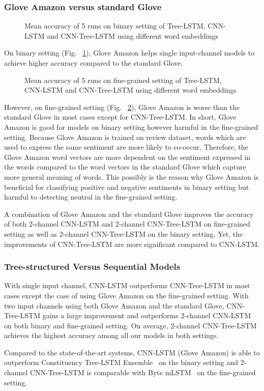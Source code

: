 \subsubsection{Glove Amazon versus standard Glove}
\begin{figure} []
	\centering
	
	\caption[qwerty]{Mean accuracy of 5 runs on binary setting of Tree-LSTM, CNN-LSTM and CNN-Tree-LSTM using different word embeddings}
	\label{graph:binary}
\end{figure}
On binary setting (Fig. ~\ref{graph:binary}), Glove Amazon helps single input-channel models to achieve higher accuracy compared to the standard Glove.
\begin{figure} []
	\centering
	
	\caption[qwerty]{Mean accuracy of 5 runs on fine-grained setting of Tree-LSTM, CNN-LSTM and CNN-Tree-LSTM using different word embeddings}
	\label{graph:fine-grained}
\end{figure}
However, on fine-grained setting (Fig. ~\ref{graph:fine-grained}), Glove Amazon is worse than the standard Glove in most cases except for CNN-Tree-LSTM.
In short, Glove Amazon is good for models on binary setting however harmful in the fine-grained setting.
Because Glove Amazon is trained on review dataset, words which are used to express the same sentiment are more likely to co-occur.
Therefore, the Glove Amazon word vectors are more dependent on the sentiment expressed in the words compared to the word vectors in the standard Glove which capture more general meaning of words.
This possibly is the reason why Glove Amazon is beneficial for classifying positive and negative sentiments in binary setting but harmful to detecting neutral in the fine-grained setting.

A combination of Glove Amazon and the standard Glove improves the accuracy of both 2-channel CNN-LSTM and 2-channel CNN-Tree-LSTM on fine-grained setting as well as 2-channel CNN-Tree-LSTM on the binary setting.
Yet, the improvements of CNN-Tree-LSTM are more significant compared to CNN-LSTM.
\subsubsection{Tree-structured Versus Sequential Models}
With single input channel, CNN-LSTM outperforms CNN-Tree-LSTM in most cases except the case of using Glove Amazon on the fine-grained setting.
With two input channels using both Glove Amazon and the standard Glove, CNN-Tree-LSTM gains a large improvement and outperforms 2-channel CNN-LSTM on both binary and fine-grained setting.
On average, 2-channel CNN-Tree-LSTM achieves the highest accuracy among all our models in both settings.

Compared to the state-of-the-art systems, CNN-LSTM (Glove Amazon) is able to outperform Constituency Tree-LSTM Ensemble~\cite{LooksHHN17} on the binary setting and 2-channel CNN-Tree-LSTM is comparable with Byte mLSTM~\cite{mlstm} on the fine-grained setting.
